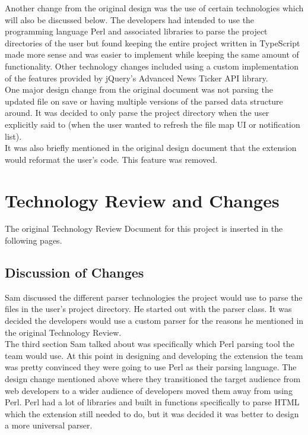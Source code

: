 \documentclass[letterpaper,10pt,titlepage,draftclsnofoot,onecolumn,onesided] {IEEEtran}
\begin{document}
Another change from the original design was the use of certain technologies which will also be discussed below.
The developers had intended to use the programming language Perl and associated libraries to parse the project directories of the user but found keeping the entire project written in TypeScript made more sense and was easier to implement while keeping the same amount of functionality. 
Other technology changes included using a custom implementation of the features provided by jQuery's Advanced News Ticker API library.\\

One major design change from the original document was not parsing the updated file on save or having multiple versions of the parsed data structure around.
It was decided to only parse the project directory when the user explicitly said to (when the user wanted to refresh the file map UI or notification list). \\

It was also briefly mentioned in the original design document that the extension would reformat the user's code.
This feature was removed.

\section{Technology Review and Changes}
The original Technology Review Document for this project is inserted in the following pages.

\subsection{Discussion of Changes}
Sam discussed the different parser technologies the project would use to parse the files in the user's project directory.
He started out with the parser class.
It was decided the developers would use a custom parser for the reasons he mentioned in the original Technology Review. \\

The third section Sam talked about was specifically which Perl parsing tool the team would use.
At this point in designing and developing the extension the team was pretty convinced they were going to use Perl as their parsing language.
The design change mentioned above where they transitioned the target audience from web developers to a wider audience of developers moved them away from using Perl.
Perl had a lot of libraries and built in functions specifically to parse HTML which the extension still needed to do, but it was decided it was better to design a more universal parser.\\
\end{document}

